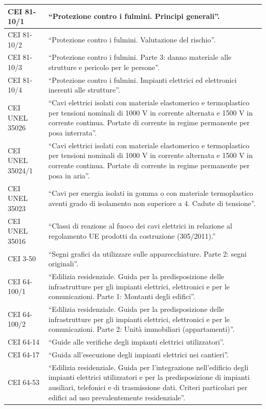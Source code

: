\begin{longtable}{|p{4cm}|p{10cm}|}
\hline
CEI 81-10/1 & ``Protezione contro i fulmini. Principi generali''. \\
\hline
CEI 81-10/2 & ``Protezione contro i fulmini. Valutazione del rischio''. \\
\hline
CEI 81-10/3 & ``Protezione contro i fulmini. Parte 3: danno materiale alle strutture e pericolo per le persone''. \\
\hline
CEI 81-10/4 & ``Protezione contro i fulmini. Impianti elettrici ed elettronici inerenti alle strutture''. \\
\hline
CEI UNEL 35026 & ``Cavi elettrici isolati con materiale elastomerico e termoplastico per tensioni nominali di 1000 V in corrente alternata e 1500 V in corrente continua. Portate di corrente in regime permanente per posa interrata''. \\
\hline
CEI UNEL 35024/1 & ``Cavi elettrici isolati con materiale elastomerico e termoplastico per tensioni nominali di 1000 V in corrente alternata e 1500 V in corrente continua. Portate di corrente in regime permanente per posa in aria''. \\
\hline
CEI UNEL 35023 & ``Cavi per energia isolati in gomma o con materiale termoplastico aventi grado di isolamento non superiore a 4. Cadute di tensione''. \\
\hline
CEI UNEL 35016 & ``Classi di reazione al fuoco dei cavi elettrici in relazione al regolamento UE prodotti da costruzione (305/2011).'' \\
\hline
CEI 3-50 & ``Segni grafici da utilizzare sulle apparecchiature. Parte 2: segni originali''. \\
\hline
CEI 64-100/1 & ``Edilizia residenziale. Guida per la predisposizione delle infrastrutture per gli impianti elettrici, elettronici e per le comunicazioni. Parte 1: Montanti degli edifici''. \\
\hline
CEI 64-100/2 & ``Edilizia residenziale. Guida per la predisposizione delle infrastrutture per gli impianti elettrici, elettronici e per le comunicazioni. Parte 2: Unità immobiliari (appartamenti)''. \\
\hline
CEI 64-14 & ``Guide alle verifiche degli impianti elettrici utilizzatori''. \\
\hline
CEI 64-17 & ``Guida all'esecuzione degli impianti elettrici nei cantieri''. \\
\hline
CEI 64-53 & ``Edilizia residenziale. Guida per l'integrazione nell'edificio degli impianti elettrici utilizzatori e per la predisposizione di impianti ausiliari, telefonici e di trasmissione dati. Criteri particolari per edifici ad uso prevalentemente residenziale''. \\

\end{longtable}
